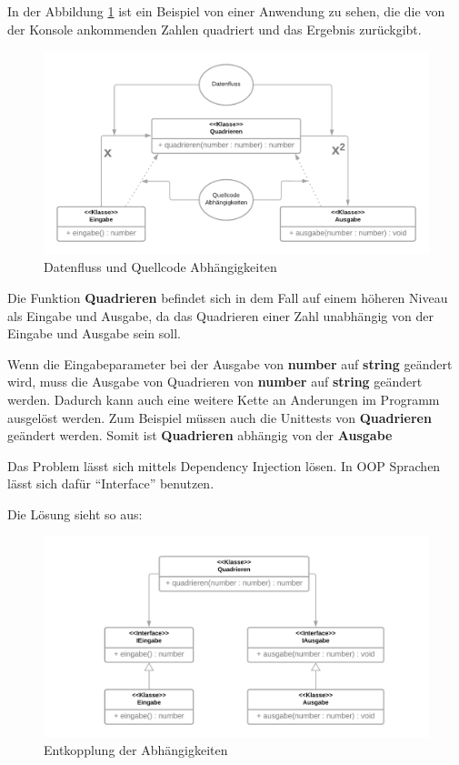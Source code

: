 In der Abbildung \ref{fig:dateflowVScodedep} ist ein Beispiel von einer Anwendung zu sehen, die die von der Konsole ankommenden Zahlen quadriert und das Ergebnis zurückgibt.
                
\begin{figure}[H]
    \centering
    \includegraphics[width=1\textwidth]{./images/DepInj_1.png}
    \caption{Datenfluss und Quellcode Abhängigkeiten}
    \label{fig:dateflowVScodedep}
\end{figure}

Die Funktion \textbf{Quadrieren} befindet sich in dem Fall auf einem höheren Niveau als Eingabe und Ausgabe, 
da das Quadrieren einer Zahl unabhängig von der Eingabe und Ausgabe sein soll.

Wenn die Eingabeparameter bei der Ausgabe von \textbf{number} auf \textbf{string} geändert wird, 
muss die Ausgabe von Quadrieren von \textbf{number} auf \textbf{string} geändert werden.
Dadurch kann auch eine weitere Kette an Anderungen im Programm ausgelöst werden. 
Zum Beispiel müssen auch die Unittests von \textbf{Quadrieren} geändert werden.
Somit ist \textbf{Quadrieren} abhängig von der \textbf{Ausgabe}

Das Problem lässt sich mittels Dependency Injection lösen.
In OOP Sprachen lässt sich dafür ``Interface'' benutzen.

Die Lösung sieht so aus: 
\begin{figure}[H]
    \centering
    \includegraphics[width=1\textwidth]{./images/DepInj_2.png}
    \caption{Entkopplung der Abhängigkeiten}
    \label{fig:flow around cylinder}
\end{figure}

